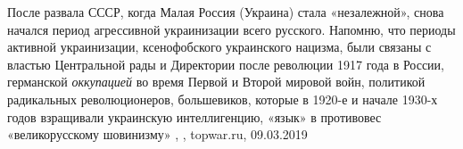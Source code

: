 После развала СССР, когда Малая Россия (Украина) стала «незалежной», снова
начался период агрессивной украинизации всего русского. Напомню, что периоды
активной украинизации, ксенофобского украинского нацизма, были связаны с
властью Центральной рады и Директории после революции 1917 года в России,
германской \emph{оккупацией} во время Первой и Второй мировой войн, политикой
радикальных революционеров, большевиков, которые в 1920-е и начале 1930-х годов
взращивали украинскую интеллигенцию, «язык» в противовес «великорусскому
шовинизму»
, , topwar.ru, 09.03.2019
